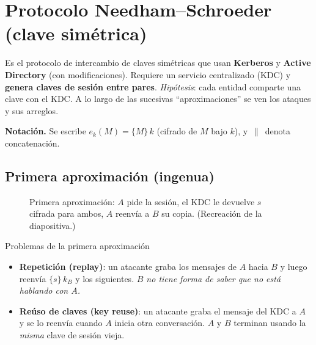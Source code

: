 \documentclass[11pt,a4paper]{article}
\newcommand{\enc}[2]{\{#1\}\,#2}          %
\newcommand{\concat}{\,\|\,}
\begin{document}
\section{Protocolo Needham--Schroeder (clave simétrica)}

Es el protocolo de intercambio de claves simétricas que usan \textbf{Kerberos} y
\textbf{Active Directory} (con modificaciones). Requiere un servicio centralizado (KDC) y
\textbf{genera claves de sesión entre pares}. \emph{Hipótesis}: cada entidad comparte una
clave con el KDC. A lo largo de las sucesivas ``aproximaciones'' se ven los ataques y sus
arreglos.

\medskip
\noindent\textbf{Notación.} Se escribe $e_k(M) = \enc{M}{k}$ (cifrado de $M$ bajo $k$), y
$\concat$ denota concatenación.

\subsection{Primera aproximación (ingenua)}

\begin{figure}[h]
\centering
{}
\caption{Primera aproximación: $A$ pide la sesión, el KDC le devuelve $s$ cifrada para ambos,
$A$ reenvía a $B$ su copia. (Recreación de la diapositiva.)}
\end{figure}

\begin{warnbox}{Problemas de la primera aproximación}
\begin{itemize}[leftmargin=1.4em,itemsep=2pt]
  \item \textbf{Repetición (replay)}: un atacante graba los mensajes de $A$ hacia $B$ y luego
        reenvía $\enc{s}{k_B}$ y los siguientes. \emph{$B$ no tiene forma de saber que no
        está hablando con $A$.}
  \item \textbf{Reúso de claves (key reuse)}: un atacante graba el mensaje del KDC a $A$ y se
        lo reenvía cuando $A$ inicia otra conversación. $A$ y $B$ terminan usando la
        \emph{misma} clave de sesión vieja.
\end{itemize}
\end{warnbox}
\end{document}
